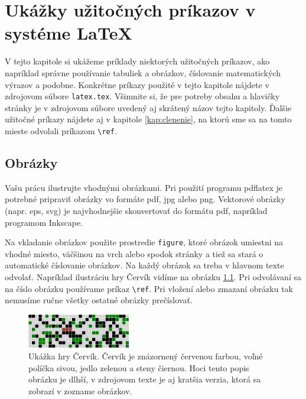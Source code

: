\chapter[LaTeX]{Ukážky užitočných príkazov v systéme LaTeX}
\label{kap:latex}

V tejto kapitole si ukážeme príklady niektorých užitočných príkazov,
ako napríklad správne používanie tabuliek a obrázkov, číslovanie
matematických výrazov a podobne. Konkrétne príkazy použité v tejto
kapitole nájdete v zdrojovom súbore \verb'latex.tex'.  Všimnite si, že
pre potreby obsahu a hlavičky stránky je v zdrojovom súbore uvedený aj
skrátený názov tejto kapitoly. Ďalšie užitočné príkazy nájdete aj v
kapitole \ref{kap:clenenie}, na ktorú sme sa na tomto mieste odvolali
príkazom \verb'\ref'.

\section{Obrázky}


Vašu prácu ilustrujte vhodnými obrázkami. Pri použití programu
pdflatex je potrebné pripraviť obrázky vo formáte pdf, jpg alebo
png. Vektorové obrázky (napr. eps, svg) je najvhodnejšie skonvertovať
do formátu pdf, napríklad programom Inkscape.

Na vkladanie obrázkov použite prostredie \verb'figure', ktoré obrázok
umiestni na vhodné miesto, väčšinou na vrch alebo spodok stránky a
tiež sa stará o automatické číslovanie obrázkov. Na každý obrázok sa
treba v hlavnom texte odvolať. Napríklad ilustráciu hry Červík vidíme
na obrázku \ref{obr:cursus}. Pri odvolávaní sa na číslo obrázku
používame príkaz \verb'\ref'. Pri vložení alebo zmazaní obrázku tak
nemusíme ručne všetky ostatné obrázky prečíslovať.

\begin{figure}
\centerline{\includegraphics[width=0.4\textwidth]{images/cervik}}
\caption[Ukážka hry Červík]{Ukážka hry Červík. Červík je znázornený červenou farbou, voľné políčka sivou, jedlo zelenou a steny čiernou. Hoci tento popis obrázku je dlhší, v zdrojovom texte je aj kratšia verzia, ktorá sa zobrazí v zozname obrázkov.}
\label{obr:cursus}
\end{figure}

